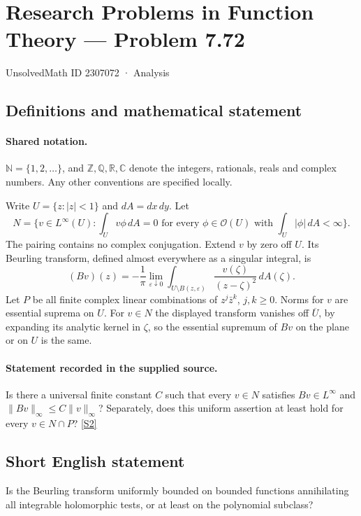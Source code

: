 \documentclass[11pt]{article}
\newcommand{\sref}[2]{\hyperlink{source:#1:#2}{[S#2]}}
\begin{document}
\setcounter{section}{2307071}
\section{Research Problems in Function Theory — Problem 7.72}\label{2307072}
{\small\sffamily UnsolvedMath ID 2307072 · Analysis}
\subsection{Definitions and mathematical statement}

\paragraph{Shared notation.}$\mathbb N=\{1,2,\ldots\}$, and $\mathbb Z,\mathbb Q,\mathbb R,\mathbb C$ denote the integers, rationals, reals and complex numbers. Any other conventions are specified locally.


Write $U=\{z:|z|<1\}$ and $dA=dx\,dy$. Let
\[N=\{v\in L^\infty(U):\int_Uv\phi\,dA=0
\text{ for every }\phi\in\mathcal O(U)\text{ with }\int_U|\phi|\,dA<\infty\}.
\]
The pairing contains no complex conjugation. Extend $v$ by zero off $U$. Its Beurling transform, defined almost everywhere as a singular integral, is
\[(Bv)(z)=-\frac1\pi\lim_{\varepsilon\downarrow0}
\int_{U\setminus B(z,\varepsilon)}\frac{v(\zeta)}{(z-\zeta)^2}\,dA(\zeta).
\]
Let $P$ be all finite complex linear combinations of $z^j\bar z^k$, $j,k\ge0$. Norms for $v$ are essential suprema on $U$. For $v\in N$ the displayed transform vanishes off $\overline U$, by expanding its analytic kernel in $\zeta$, so the essential supremum of $Bv$ on the plane or on $U$ is the same.
\paragraph{Statement recorded in the supplied source.}
Is there a universal finite constant $C$ such that every $v\in N$ satisfies $Bv\in L^\infty$ and $\|Bv\|_\infty\le C\|v\|_\infty$? Separately, does this uniform assertion at least hold for every $v\in N\cap P$? \sref{2307072}{2}
\subsection{Short English statement}
Is the Beurling transform uniformly bounded on bounded functions annihilating all integrable holomorphic tests, or at least on the polynomial subclass?
\end{document}
